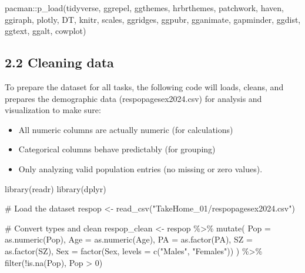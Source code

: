 \documentclass[
  letterpaper,
  DIV=11,
  numbers=noendperiod]{scrartcl}
\newenvironment{Shaded}{\begin{snugshade}}{\end{snugshade}}
\newcommand{\AttributeTok}[1]{\textcolor[rgb]{0.40,0.45,0.13}{#1}}
\newcommand{\CommentTok}[1]{\textcolor[rgb]{0.37,0.37,0.37}{#1}}
\newcommand{\DecValTok}[1]{\textcolor[rgb]{0.68,0.00,0.00}{#1}}
\newcommand{\FunctionTok}[1]{\textcolor[rgb]{0.28,0.35,0.67}{#1}}
\newcommand{\NormalTok}[1]{\textcolor[rgb]{0.00,0.23,0.31}{#1}}
\newcommand{\OtherTok}[1]{\textcolor[rgb]{0.00,0.23,0.31}{#1}}
\newcommand{\SpecialCharTok}[1]{\textcolor[rgb]{0.37,0.37,0.37}{#1}}
\newcommand{\StringTok}[1]{\textcolor[rgb]{0.13,0.47,0.30}{#1}}
\begin{document}
\begin{Shaded}
\begin{Highlighting}[]
\NormalTok{pacman}\SpecialCharTok{::}\FunctionTok{p\_load}\NormalTok{(tidyverse, ggrepel, ggthemes, }
\NormalTok{               hrbrthemes, patchwork, }
\NormalTok{               haven, ggiraph, plotly, DT, }
\NormalTok{               knitr, scales,}
\NormalTok{               ggridges, ggpubr, }
\NormalTok{               gganimate, gapminder, ggdist, }
\NormalTok{               ggtext, ggalt,}
\NormalTok{               cowplot)}
\end{Highlighting}
\end{Shaded}

\subsection{2.2 Cleaning data}\label{cleaning-data}

To prepare the dataset for all tasks, the following code will loads,
cleans, and prepares the demographic data (respopagesex2024.csv) for
analysis and visualization to make sure:

\begin{itemize}
\item
  All numeric columns are actually numeric (for calculations)
\item
  Categorical columns behave predictably (for grouping)
\item
  Only analyzing valid population entries (no missing or zero values).
\end{itemize}

\begin{Shaded}
\begin{Highlighting}[]
\FunctionTok{library}\NormalTok{(readr)}
\FunctionTok{library}\NormalTok{(dplyr)}

\CommentTok{\# Load the dataset}
\NormalTok{respop }\OtherTok{\textless{}{-}} \FunctionTok{read\_csv}\NormalTok{(}\StringTok{"TakeHome\_01/respopagesex2024.csv"}\NormalTok{)}

\CommentTok{\# Convert types and clean}
\NormalTok{respop\_clean }\OtherTok{\textless{}{-}}\NormalTok{ respop }\SpecialCharTok{\%\textgreater{}\%}
  \FunctionTok{mutate}\NormalTok{(}
    \AttributeTok{Pop =} \FunctionTok{as.numeric}\NormalTok{(Pop),}
    \AttributeTok{Age =} \FunctionTok{as.numeric}\NormalTok{(Age),}
    \AttributeTok{PA =} \FunctionTok{as.factor}\NormalTok{(PA),}
    \AttributeTok{SZ =} \FunctionTok{as.factor}\NormalTok{(SZ),}
    \AttributeTok{Sex =} \FunctionTok{factor}\NormalTok{(Sex, }\AttributeTok{levels =} \FunctionTok{c}\NormalTok{(}\StringTok{"Males"}\NormalTok{, }\StringTok{"Females"}\NormalTok{))}
\NormalTok{  ) }\SpecialCharTok{\%\textgreater{}\%}
  \FunctionTok{filter}\NormalTok{(}\SpecialCharTok{!}\FunctionTok{is.na}\NormalTok{(Pop), Pop }\SpecialCharTok{\textgreater{}} \DecValTok{0}\NormalTok{)}
\end{Highlighting}
\end{Shaded}
\end{document}
